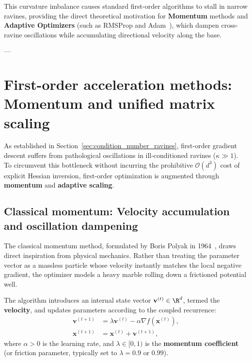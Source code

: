 This curvature imbalance causes standard first-order algorithms to stall in narrow ravines, providing the direct theoretical motivation for \textbf{Momentum} methods and \textbf{Adaptive Optimizers} (such as RMSProp and Adam~\cite{kingma2014adam}), which dampen cross-ravine oscillations while accumulating directional velocity along the base.

---

\section{First-order acceleration methods: Momentum and unified matrix scaling}
\label{sec:first_order_acceleration_methods}

As established in Section~\ref{sec:condition_number_ravines}, first-order gradient descent suffers from pathological oscillations in ill-conditioned ravines ($\kappa \gg 1$). To circumvent this bottleneck without incurring the prohibitive $\mathcal{O}(d^3)$ cost of explicit Hessian inversion, first-order optimization is augmented through \textbf{momentum} and \textbf{adaptive scaling}.

\subsection{Classical momentum: Velocity accumulation and oscillation dampening}
\label{sec:classical_momentum}

The classical momentum method, formulated by Boris Polyak in 1964~\cite{polyak1964some}, draws direct inspiration from physical mechanics. Rather than treating the parameter vector as a massless particle whose velocity instantly matches the local negative gradient, the optimizer models a heavy marble rolling down a frictioned potential well.

The algorithm introduces an internal state vector $\mathbf{v}^{(t)} \in \R^d$, termed the \textbf{velocity}, and updates parameters according to the coupled recurrence:
\begin{align}
\mathbf{v}^{(t+1)} &= \lambda \mathbf{v}^{(t)} - \alpha \nabla f(\mathbf{x}^{(t)}), \label{eq:momentum_velocity_update} \\
\mathbf{x}^{(t+1)} &= \mathbf{x}^{(t)} + \mathbf{v}^{(t+1)}, \label{eq:momentum_position_update}
\end{align}
where $\alpha > 0$ is the learning rate, and $\lambda \in [0, 1)$ is the \textbf{momentum coefficient} (or friction parameter, typically set to $\lambda = 0.9$ or $0.99$).

